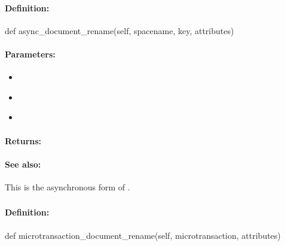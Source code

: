 \paragraph{Definition:}
\begin{pythoncode}
def async_document_rename(self, spacename, key, attributes)
\end{pythoncode}

\paragraph{Parameters:}
\begin{itemize}[noitemsep]
\item {}\\

\item {}\\

\item {}\\

\end{itemize}

\paragraph{Returns:}


\paragraph{See also:}  This is the asynchronous form of .

\pagebreak
\subsubsection{}
\label{api:python:microtransaction_document_rename}


\paragraph{Definition:}
\begin{pythoncode}
def microtransaction_document_rename(self, microtransaction, attributes)
\end{pythoncode}

